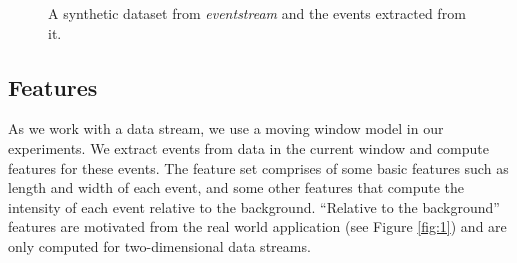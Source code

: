 \documentclass[11pt]{article}
\begin{document}
	 \begin{figure}[H]
	 	\centering
	 	\caption{\footnotesize A synthetic dataset from {\it eventstream} and the events extracted from it.} 
	 	\label{fig:blobs_A_B}
	 \end{figure}
	 
	 \subsection{Features}\label{sec:Featurelist}
	 As we work with a data stream, we use a moving window model in our experiments. We extract events from data in the current window and compute features for these events. The feature set comprises of some basic features such as length and width of each event, and some other features that compute the intensity of each event relative to the background. ``Relative to the background'' features  are motivated from the real world application (see Figure \ref{fig:1}) and are only computed for two-dimensional data streams.  
	 
\end{document}
